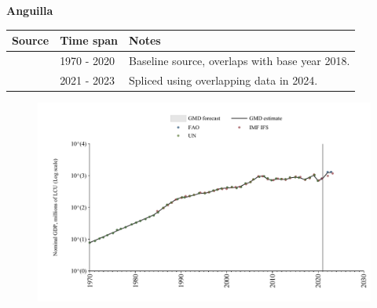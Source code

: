 \documentclass[12pt,a4paper,landscape]{article}
\begin{document}
\begin{adjustbox}{max totalsize={\paperwidth}{\paperheight},center}
\begin{minipage}[t][\textheight][t]{\textwidth}
\vspace*{0.5cm}
{}
\begin{center}
{\Large\bfseries Anguilla}
\end{center}
\vspace{0.5cm}
\begin{table}[H]
\centering
\small
\begin{tabular}{|l|l|l|}
\hline
\textbf{Source} & \textbf{Time span} & \textbf{Notes} \\
\hline
\rowcolor{white}\cite{UN}& 1970 - 2020 &Baseline source, overlaps with base year 2018.\\
\rowcolor{lightgray}\cite{FAO}& 2021 - 2023 &Spliced using overlapping data in 2024.\\
\hline
\end{tabular}
\end{table}
\begin{figure}[H]
\centering
\includegraphics[width=\textwidth,height=0.6\textheight,keepaspectratio]{graphs/AIA_nGDP.pdf}
\end{figure}
\end{minipage}
\end{adjustbox}
\end{document}
